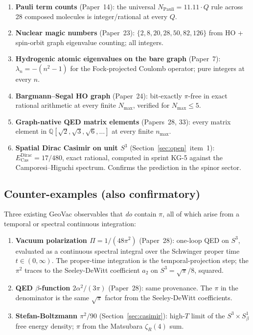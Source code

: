 \documentclass[11pt]{article}
\begin{document}
\begin{enumerate}
\setlength\itemsep{0pt}
\item \textbf{Pauli term counts} (Paper~14): the universal $N_\text{Pauli}
= 11.11 \cdot Q$ rule across 28 composed molecules is integer/rational
at every $Q$.
\item \textbf{Nuclear magic numbers} (Paper~23): $\{2, 8, 20, 28, 50,
82, 126\}$ from HO + spin-orbit graph eigenvalue counting; all integers.
\item \textbf{Hydrogenic atomic eigenvalues on the bare graph}
(Paper~7): $\lambda_n = -(n^2 - 1)$ for the Fock-projected Coulomb
operator; pure integers at every $n$.
\item \textbf{Bargmann--Segal HO graph} (Paper~24): bit-exactly
$\pi$-free in exact rational arithmetic at every finite $N_\text{max}$,
verified for $N_\text{max} \leq 5$.
\item \textbf{Graph-native QED matrix elements} (Papers~28, 33): every
matrix element in $\mathbb{Q}[\sqrt{2}, \sqrt{3}, \sqrt{6}, \ldots]$ at
every finite $n_\text{max}$.
\item \textbf{Spatial Dirac Casimir on unit $S^3$} (Section~\ref{sec:open}~item~1):
$E^{\text{Dirac}}_\text{Cas} = 17/480$, exact rational, computed in
sprint KG-5 against the Camporesi--Higuchi spectrum.  Confirms the
prediction in the spinor sector.
\end{enumerate}

\subsection{Counter-examples (also confirmatory)}

Three existing GeoVac observables that \emph{do} contain $\pi$, all of
which arise from a temporal or spectral continuous integration:

\begin{enumerate}
\setlength\itemsep{0pt}
\item \textbf{Vacuum polarization $\Pi = 1/(48\pi^2)$} (Paper~28):
one-loop QED on $S^3$, evaluated as a continuous spectral integral over
the Schwinger proper time $t \in (0, \infty)$.  The proper-time
integration is the temporal-projection step; the $\pi^2$ traces to the
Seeley-DeWitt coefficient $a_2$ on $S^3 = \sqrt{\pi}/8$, squared.
\item \textbf{QED $\beta$-function $2\alpha^2/(3\pi)$} (Paper~28):
same provenance.  The $\pi$ in the denominator is the same $\sqrt{\pi}$
factor from the Seeley-DeWitt coefficients.
\item \textbf{Stefan-Boltzmann $\pi^2/90$} (Section~\ref{sec:casimir}):
high-$T$ limit of the $S^3 \times S^1_\beta$ free energy density;
$\pi$ from the Matsubara $\zeta_R(4)$ sum.
\end{enumerate}
\end{document}
